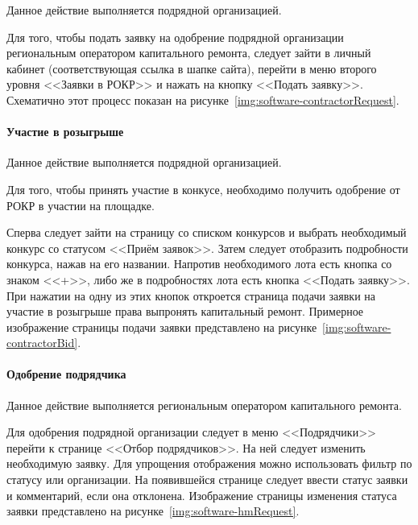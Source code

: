 Данное действие выполняется подрядной организацией.

Для того, чтобы подать заявку на одобрение подрядной организации региональным оператором капитального ремонта, следует зайти в личный кабинет (соответствующая ссылка в шапке сайта), перейти в меню второго уровня <<Заявки в РОКР>> и нажать на кнопку <<Подать заявку>>.
Схематично этот процесс показан на рисунке~\ref{img:software-contractorRequest}.


\paragraph{Участие в розыгрыше}

Данное действие выполняется подрядной организацией.

Для того, чтобы принять участие в конкусе, необходимо получить одобрение от РОКР в участии на площадке.

Сперва следует зайти на страницу со списком конкурсов и выбрать необходимый конкурс со статусом <<Приём заявок>>.
Затем следует отобразить подробности конкурса, нажав на его названии.
Напротив необходимого лота есть кнопка со знаком <<+>>, либо же в подробностях лота есть кнопка <<Подать заявку>>.
При нажатии на одну из этих кнопок откроется страница подачи заявки на участие в розыгрыше права выпронять капитальный ремонт.
Примерное изображение страницы подачи заявки представлено на рисунке~\ref{img:software-contractorBid}.


\paragraph{Одобрение подрядчика}

Данное действие выполняется региональным оператором капитального ремонта.

Для одобрения подрядной организации следует в меню <<Подрядчики>> перейти к странице <<Отбор подрядчиков>>.
На ней следует изменить необходимую заявку.
Для упрощения отображения можно использовать фильтр по статусу или организации.
На появившейся странице следует ввести статус заявки и комментарий, если она отклонена.
Изображение страницы изменения статуса заявки представлено на рисунке~\ref{img:software-hmRequest}.

